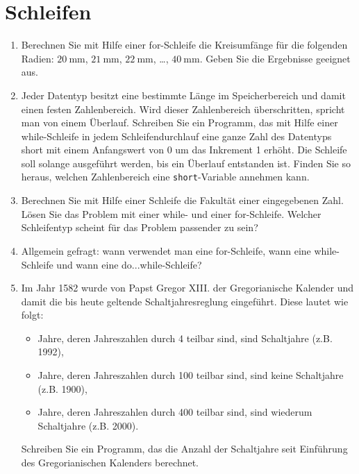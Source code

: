 \documentclass[paper=a4, fontsize=11pt, twoside]{scrartcl}
\begin{document}
\section*{Schleifen}
\begin{enumerate}[resume]
  \item Berechnen Sie mit Hilfe einer for-Schleife die Kreisumfänge für die folgenden Radien: $\SI{20}{\mm}$, $\SI{21}{\mm}$, $\SI{22}{\mm}$, \dots, $\SI{40}{\mm}$. Geben Sie die Ergebnisse geeignet aus.
  \item Jeder Datentyp besitzt eine bestimmte Länge im Speicherbereich und damit einen festen Zahlenbereich. Wird dieser Zahlenbereich überschritten, spricht man von einem Überlauf. Schreiben Sie ein Programm, das mit Hilfe einer while-Schleife in jedem Schleifendurchlauf eine ganze Zahl des Datentyps short mit einem Anfangswert von 0 um das Inkrement 1 erhöht. Die Schleife soll solange ausgeführt werden, bis ein Überlauf entstanden ist. Finden Sie so heraus, welchen Zahlenbereich eine \texttt{short}-Variable annehmen kann.
  \item Berechnen Sie mit Hilfe einer Schleife die Fakultät einer eingegebenen Zahl. Lösen Sie das Problem mit einer while- und einer for-Schleife. Welcher Schleifentyp scheint für das Problem passender zu sein?
  \item Allgemein gefragt: wann verwendet man eine for-Schleife, wann eine while-Schleife und wann eine do...while-Schleife?
 \item Im Jahr 1582 wurde von  Papst Gregor XIII. der Gregorianische Kalender und damit die bis heute geltende Schaltjahresreglung eingeführt. Diese lautet wie folgt:
   \begin{itemize}
   \item Jahre, deren Jahreszahlen durch 4 teilbar sind, sind Schaltjahre (z.B. 1992), 
   \item Jahre, deren Jahreszahlen durch 100 teilbar sind, sind keine Schaltjahre (z.B. 1900), 
   \item Jahre, deren Jahreszahlen durch 400 teilbar sind, sind wiederum Schaltjahre (z.B. 2000).
   \end{itemize}
   Schreiben Sie ein Programm, das die Anzahl der Schaltjahre seit Einführung des Gregorianischen Kalenders berechnet.
\end{enumerate}
\end{document}
